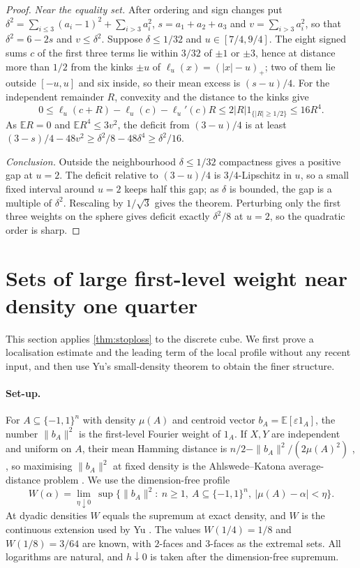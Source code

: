 \documentclass[11pt,a4paper]{article}
\numberwithin{equation}{section}
\theoremstyle{remark}
\newcommand{\E}{\mathbb E}
\begin{document}
\begin{proof}
\emph{Near the equality set.} After ordering and sign changes put
$\delta^2=\sum_{i\le3}(a_i-1)^2+\sum_{i>3}a_i^2$, $s=a_1+a_2+a_3$ and
$v=\sum_{i>3}a_i^2$, so that $\delta^2=6-2s$ and $v\le\delta^2$. Suppose
$\delta\le1/32$ and $u\in[7/4,9/4]$. The eight signed sums $c$ of the first
three terms lie within $3/32$ of $\pm1$ or $\pm3$, hence at distance more
than $1/2$ from the kinks $\pm u$ of $\ell_u(x)=(|x|-u)_+$; two of them lie
outside $[-u,u]$ and six inside, so their mean excess is $(s-u)/4$. For the
independent remainder $R$, convexity and the distance to the kinks give
\[
 0\le\ell_u(c+R)-\ell_u(c)-\ell_u'(c)R\le2|R|1_{\{|R|\ge1/2\}}\le16R^4 .
\]
As $\E R=0$ and $\E R^4\le3v^2$, the deficit from $(3-u)/4$ is at least
$(3-s)/4-48v^2\ge\delta^2/8-48\delta^4\ge\delta^2/16$.

\emph{Conclusion.} Outside the neighbourhood $\delta\le1/32$ compactness
gives a positive gap at $u=2$. The deficit relative to $(3-u)/4$ is
$3/4$-Lipschitz in $u$, so a small fixed interval around $u=2$ keeps half
this gap; as $\delta$ is bounded, the gap is a multiple of $\delta^2$.
Rescaling by $1/\sqrt3$ gives the theorem. Perturbing only the first three
weights on the sphere gives deficit exactly $\delta^2/8$ at $u=2$, so the
quadratic order is sharp.
\end{proof}

\section{Sets of large first-level weight near density one quarter}\label{sec:cube}

This section applies \cref{thm:stoploss} to the discrete cube. We first
prove a localisation estimate and the leading term of the local profile
without any recent input, and then use Yu's small-density theorem to obtain
the finer structure.

\paragraph{Set-up.}
For $A\subseteq\{-1,1\}^n$ with density $\mu(A)$ and centroid vector
$b_A=\E[\varepsilon1_A]$, the number $\|b_A\|^2$ is the first-level Fourier
weight of $1_A$. If $X,Y$ are independent and uniform on $A$, their mean
Hamming distance is $n/2-\|b_A\|^2/(2\mu(A)^2)$ \cite[Lemma~2.1]{FangHuang},
\cite[equation~(4)]{YuLevel}, so maximising $\|b_A\|^2$ at fixed density is
the Ahlswede--Katona average-distance problem \cite{AhlswedeKatona}. We use
the dimension-free profile
\[
 W(\alpha)=\lim_{\eta\downarrow0}\ \sup\bigl\{\|b_A\|^2:\ n\ge1,\
 A\subseteq\{-1,1\}^n,\ |\mu(A)-\alpha|<\eta\bigr\}.
\]
At dyadic densities $W$ equals the supremum at exact density, and $W$ is the
continuous extension used by Yu \cite[Section~II-D]{YuLevel}. The values
$W(1/4)=1/8$ \cite{FuWeiYeung} and $W(1/8)=3/64$ \cite{FangHuang} are
known, with $2$-faces and $3$-faces as the extremal sets. All logarithms are
natural, and $h\downarrow0$ is taken after the dimension-free supremum.
\end{document}
